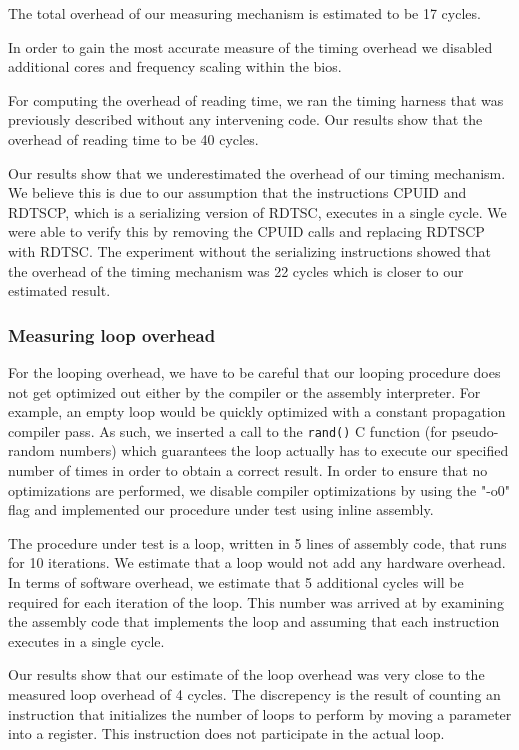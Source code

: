 The total overhead of our measuring mechanism is estimated to be 17 cycles.

In order to gain the most accurate measure of the timing overhead we disabled 
additional cores and frequency scaling within the bios.

For computing the overhead of reading time, we ran the timing harness that was
previously described without any intervening code.  Our results show that the
overhead of reading time to be 40 cycles. 

Our results show that we underestimated the overhead of our timing mechanism. We
believe this is due to our assumption that the instructions CPUID and RDTSCP, which is a
serializing version of RDTSC, executes in a single cycle. We were able to verify
this by removing the CPUID calls and replacing RDTSCP with RDTSC. The experiment
without the serializing instructions showed that the overhead of the timing
mechanism was 22 cycles which is closer to our estimated result.

\subsubsection{Measuring loop overhead}

For the looping overhead,  we have to be careful that our looping procedure does
not get optimized out either by the compiler or the assembly interpreter. For
example, an empty loop would be quickly optimized with a constant propagation
compiler pass. As such, we inserted a call to the \texttt{rand()} C function
(for pseudo-random numbers) which guarantees the loop actually has to execute
our specified number of times in order to obtain a correct result. In order to
ensure that no optimizations are performed,  we disable compiler optimizations by using the "-o0" flag 
and implemented our procedure under test using inline assembly.

The procedure under test is a loop, written in 5 lines of assembly code, that runs for 10 iterations.
We estimate that a loop would not add any hardware overhead. In terms of
software overhead, we estimate that 5 additional cycles will be required for
each iteration of the loop. This number was arrived at by examining the assembly
code that implements the loop and assuming that each instruction executes in a
single cycle.

Our results show that our estimate of the loop overhead was very close to the
measured loop overhead of 4 cycles. The discrepency is the result of counting an
instruction that initializes the number of loops to perform by moving a
parameter into a register. This instruction does not participate in the actual
loop.

